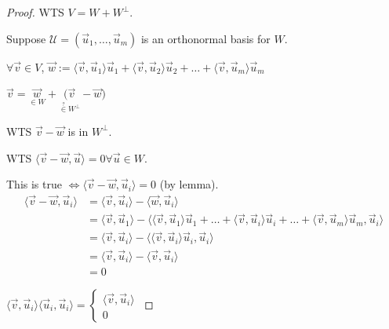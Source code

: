 \documentclass[11pt,fleqn]{book} %
\begin{document}
\begin{proof}
    WTS $V = W + W^\perp$.

    Suppose $\mathcal{U} = (\vec{u}_1, \dots, \vec{u}_m)$ is an orthonormal basis for $W$.

    $\forall \vec{v} \in V$, $\vec{w} := \langle \vec{v}, \vec{u}_1 \rangle\vec{u}_1 + \langle \vec{v}, \vec{u}_2 \rangle\vec{u}_2 + \dots + \langle \vec{v}, \vec{u}_m \rangle\vec{u}_m$

    $\vec{v} = \underset{\in W}{\vec{w}} + \underset{\overset{?}{\in} W^\perp}{(\vec{v}} - \vec{w})$

    WTS $\vec{v} - \vec{w}$ is in $W^\perp$.

    WTS $\langle \vec{v} - \vec{w}, \vec{u} \rangle = 0 \forall \vec{u} \in W$.

    This is true $\iff \langle \vec{v} - \vec{w}, \vec{u}_i \rangle = 0$ (by lemma).
    \begin{align*}
        \langle \vec{v} - \vec{w}, \vec{u}_i \rangle
        &= \langle \vec{v}, \vec{u}_i \rangle - \langle \vec{w}, \vec{u}_i \rangle
        \\
        &= \langle \vec{v}, \vec{u}_1 \rangle - \langle \langle \vec{v}, \vec{u}_1 \rangle\vec{u}_1 + \dots + \langle \vec{v}, \vec{u}_i \rangle\vec{u}_i + \dots + \langle \vec{v}, \vec{u}_m \rangle \vec{u}_m, \vec{u}_i \rangle
        \\
        &= \langle \vec{v}, \vec{u}_i \rangle - \langle \langle \vec{v}, \vec{u}_i \rangle \vec{u}_i, \vec{u}_i \rangle
        \\
        &= \langle \vec{v}, \vec{u}_i \rangle - \langle \vec{v}, \vec{u}_i \rangle
        \\
        &= 0
    \end{align*}

$\langle \vec{v}, \vec{u}_i \rangle \langle \vec{u}_i, \vec{u}_i \rangle = \begin{cases} \langle \vec{v}, \vec{u}_i \rangle \\ 0  \end{cases}
$
\end{proof}
\end{document}
